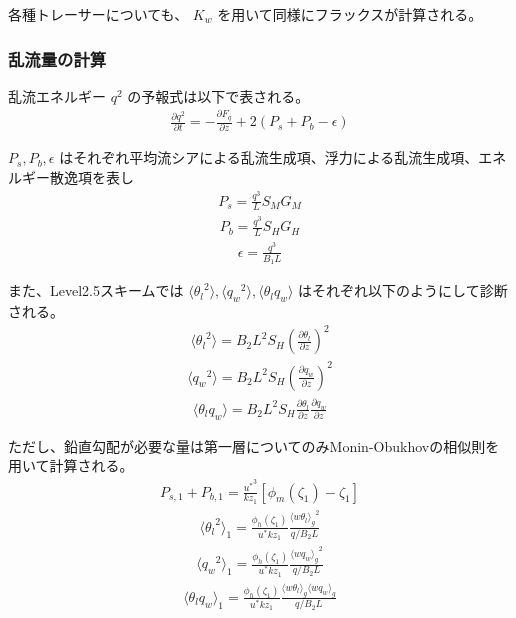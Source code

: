 各種トレーサーについても、 \(K_w\)
を用いて同様にフラックスが計算される。

\hypertarget{ux4e71ux6d41ux91cfux306eux8a08ux7b97}{%
\subsubsection{乱流量の計算}\label{ux4e71ux6d41ux91cfux306eux8a08ux7b97}}

乱流エネルギー \(q^2\) の予報式は以下で表される。
\begin{eqnarray}\frac{\partial q^2}{\partial t}=-\frac{\partial F_q}{\partial z}+2\left(P_s+P_b-\epsilon\right)\end{eqnarray}

\(P_s,P_b,\epsilon\)
はそれぞれ平均流シアによる乱流生成項、浮力による乱流生成項、エネルギー散逸項を表し
\begin{eqnarray}P_s=\frac{q^3}{L}S_MG_M\end{eqnarray} \begin{eqnarray}P_b=\frac{q^3}{L}S_HG_H\end{eqnarray}
\begin{eqnarray}\epsilon=\frac{q^3}{B_1L}\end{eqnarray}

また、Level2.5スキームでは
\(\langle {\theta_l}^2 \rangle,\langle {q_w}^2 \rangle,\langle \theta_l q_w \rangle\)
はそれぞれ以下のようにして診断される。
\begin{eqnarray}\langle {\theta_l}^2 \rangle =B_2L^2S_H\left(\frac{\partial \theta_l}{\partial z}\right)^2\end{eqnarray}
\begin{eqnarray}\langle {q_w}^2 \rangle =B_2L^2S_H\left(\frac{\partial q_w}{\partial z}\right)^2\end{eqnarray}
\begin{eqnarray}\langle \theta_l q_w \rangle =B_2L^2S_H\frac{\partial \theta_l}{\partial z}\frac{\partial q_w}{\partial z}\end{eqnarray}

ただし、鉛直勾配が必要な量は第一層についてのみMonin-Obukhovの相似則を用いて計算される。
\begin{eqnarray}P_{s,1}+P_{b,1}=\frac{{u^*}^3}{kz_1}\left[\phi_m\left(\zeta_1\right)-\zeta_1\right]\end{eqnarray}
\begin{eqnarray}\langle {\theta_l}^2\rangle_1=\frac{\phi_h\left(\zeta_1\right)}{u^*kz_1}\frac{{\langle w\theta_l \rangle_g}^2}{q/B_2L}\end{eqnarray}
\begin{eqnarray}\langle {q_w}^2\rangle_1=\frac{\phi_h\left(\zeta_1\right)}{u^*kz_1}\frac{{\langle wq_w\rangle_g}^2}{q/B_2L}\end{eqnarray}
\begin{eqnarray}\langle \theta_lq_w\rangle_1=\frac{\phi_h\left(\zeta_1\right)}{u^*kz_1}\frac{\langle w\theta_l \rangle_g\langle wq_w \rangle_g}{q/B_2L}\end{eqnarray}

